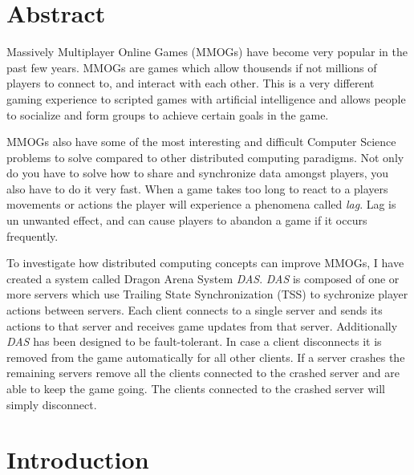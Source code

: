 \documentclass{article}
\begin{document}
\maketitle
\date{}

\section{Abstract}

Massively Multiplayer Online Games (MMOGs) have become very popular in the past few years. MMOGs are games which allow thousends if not millions of players to connect to, and interact with each other. This is a very different gaming experience to scripted games with artificial intelligence and allows people to socialize and form groups to achieve certain goals in the game.

MMOGs also have some of the most interesting and difficult Computer Science problems to solve compared to other distributed computing paradigms. Not only do you have to solve how to share and synchronize data amongst players, you also have to do it very fast. When a game takes too long to react to a players movements or actions the player will experience a phenomena called \textit{lag}. Lag is un unwanted effect, and can cause players to abandon a game if it occurs frequently.

To investigate how distributed computing concepts can improve MMOGs, I have created a system called Dragon Arena System \textit{DAS}. \textit{DAS} is composed of one or more servers which use Trailing State Synchronization (TSS) to sychronize player actions between servers. Each client connects to a single server and sends its actions to that server and receives game updates from that server. Additionally \textit{DAS} has been designed to be fault-tolerant. In case a client disconnects it is removed from the game automatically for all other clients. If a server crashes the remaining servers remove all the clients connected to the crashed server and are able to keep the game going. The clients connected to the crashed server will simply disconnect.


\section{Introduction}
\end{document}
